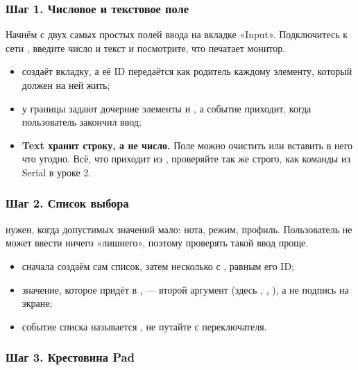 \subsubsection{Шаг 1. Числовое и текстовое поле}

Начнём с двух самых простых полей ввода на вкладке «Input». Подключитесь к сети ,
введите число и текст и посмотрите, что печатает монитор.


\begin{itemize}[leftmargin=*]
  \item {} создаёт вкладку, а её ID передаётся как родитель каждому элементу, который
        должен на ней жить;
  \item у  границы задают дочерние элементы  и , а событие 
        приходит, когда пользователь закончил ввод;
  \item \textbf{Text хранит строку, а не число.} Поле можно очистить или вставить в него что угодно.
        Всё, что приходит из , проверяйте так же строго, как команды из Serial в уроке 2.
\end{itemize}

\subsubsection{Шаг 2. Список выбора}

 нужен, когда допустимых значений мало: нота, режим, профиль. Пользователь не может ввести
ничего «лишнего», поэтому проверять такой ввод проще.


\begin{itemize}[leftmargin=*]
  \item сначала создаём сам список, затем несколько  с , равным его ID;
  \item значение, которое придёт в , --- второй аргумент 
        (здесь , , ), а не подпись на экране;
  \item событие списка называется , не путайте с  переключателя.
\end{itemize}

\subsubsection{Шаг 3. Крестовина Pad}

